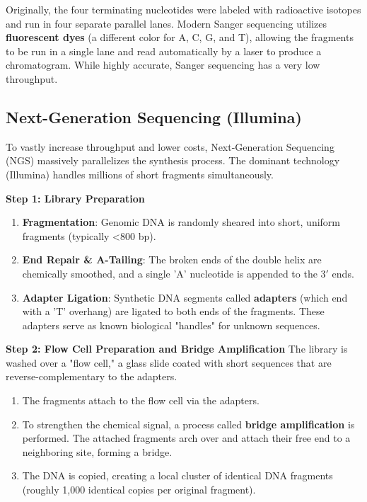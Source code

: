 \documentclass[11pt,a4paper]{article}
\begin{document}
Originally, the four terminating nucleotides were labeled with radioactive isotopes and run in four separate parallel lanes. Modern Sanger sequencing utilizes \textbf{fluorescent dyes} (a different color for A, C, G, and T), allowing the fragments to be run in a single lane and read automatically by a laser to produce a chromatogram. While highly accurate, Sanger sequencing has a very low throughput.


\subsection{Next-Generation Sequencing (Illumina)}
To vastly increase throughput and lower costs, Next-Generation Sequencing (NGS) massively parallelizes the synthesis process. The dominant technology (Illumina) handles millions of short fragments simultaneously.

\textbf{Step 1: Library Preparation}
\begin{enumerate}
    \item \textbf{Fragmentation}: Genomic DNA is randomly sheared into short, uniform fragments (typically <800 bp).
    \item \textbf{End Repair \& A-Tailing}: The broken ends of the double helix are chemically smoothed, and a single 'A' nucleotide is appended to the \(3'\) ends.
    \item \textbf{Adapter Ligation}: Synthetic DNA segments called \textbf{adapters} (which end with a 'T' overhang) are ligated to both ends of the fragments. These adapters serve as known biological "handles" for unknown sequences.
\end{enumerate}

\textbf{Step 2: Flow Cell Preparation and Bridge Amplification}
The library is washed over a "flow cell," a glass slide coated with short sequences that are reverse-complementary to the adapters.
\begin{enumerate}
    \item The fragments attach to the flow cell via the adapters.
    \item To strengthen the chemical signal, a process called \textbf{bridge amplification} is performed. The attached fragments arch over and attach their free end to a neighboring site, forming a bridge. 
    \item The DNA is copied, creating a local cluster of identical DNA fragments (roughly 1,000 identical copies per original fragment).
\end{enumerate}
\end{document}
